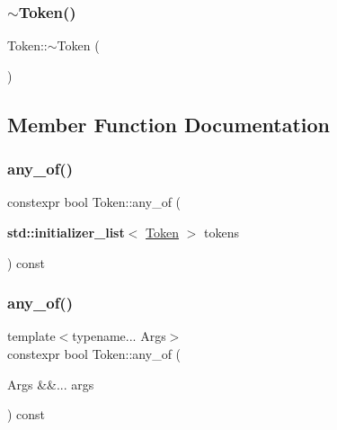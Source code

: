 \subsubsection{\texorpdfstring{$\sim$\+Token()}{~Token()}}
{\footnotesize\ttfamily Token\+::$\sim$\+Token (\begin{DoxyParamCaption}{ }\end{DoxyParamCaption})\hspace{0.3cm}{\ttfamily [default]}}



\subsection{Member Function Documentation}
\mbox{\label{class_token_a0aeba20251cf6afb5f9deee77bc10e2c}} 
\subsubsection{\texorpdfstring{any\+\_\+of()}{any\_of()}\hspace{0.1cm}{\footnotesize\ttfamily [1/2]}}
{\footnotesize\ttfamily constexpr bool Token\+::any\+\_\+of (\begin{DoxyParamCaption}\item[{\textbf{ std\+::initializer\+\_\+list}$<$ \hyperlink{class_token}{Token} $>$}]{tokens }\end{DoxyParamCaption}) const\hspace{0.3cm}{\ttfamily [inline]}}

\mbox{\label{class_token_a154f07c45f704f530fcf5b0ef2eaeeef}} 
\subsubsection{\texorpdfstring{any\+\_\+of()}{any\_of()}\hspace{0.1cm}{\footnotesize\ttfamily [2/2]}}
{\footnotesize\ttfamily template$<$typename... Args$>$ \\
constexpr bool Token\+::any\+\_\+of (\begin{DoxyParamCaption}\item[{Args \&\&...}]{args }\end{DoxyParamCaption}) const\hspace{0.3cm}{\ttfamily [inline]}}


